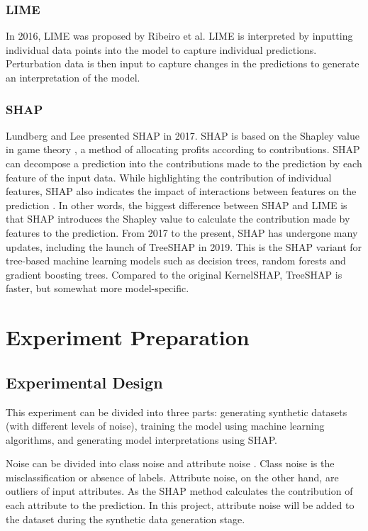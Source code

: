 \documentclass[runningheads,a4paper]{llncs}
\begin{document}
\subsubsection{LIME}
In 2016, LIME was proposed by Ribeiro et al\cite{ribeiro2016should}.
LIME is interpreted by inputting individual data points into the model to capture individual predictions. Perturbation data is then input to capture changes in the predictions to generate an interpretation of the model.
\subsubsection{SHAP}
Lundberg and Lee presented SHAP in 2017\cite{lundberg2017unified}.
SHAP is based on the Shapley value in game theory \cite{Shapley1953}, a method of allocating profits according to contributions.
SHAP can decompose a prediction into the contributions made to the prediction by each feature of the input data.
While highlighting the contribution of individual features, SHAP also indicates the impact of interactions between features on the prediction \cite{lundberg2017unified}.
In other words, the biggest difference between SHAP and LIME is that SHAP introduces the Shapley value to calculate the contribution made by features to the prediction\cite{lundberg2017unified}.
From 2017 to the present, SHAP has undergone many updates, including the launch of TreeSHAP in 2019\cite{lundberg2019consistent}.
This is the SHAP variant for tree-based machine learning models such as decision trees, random forests and gradient boosting trees. 
Compared to the original KernelSHAP, TreeSHAP is faster, but somewhat more model-specific.

\section{Experiment Preparation}

\subsection{Experimental Design}
This experiment can be divided into three parts: generating synthetic datasets (with different levels of noise), training the model using machine learning algorithms, and generating model interpretations using SHAP.

Noise can be divided into class noise and attribute noise \cite{Zhu2004}. 
Class noise is the misclassification or absence of labels.
Attribute noise, on the other hand, are outliers of input attributes.
As the SHAP method calculates the contribution of each attribute to the prediction.
In this project, attribute noise will be added to the dataset during the synthetic data generation stage.
\end{document}

